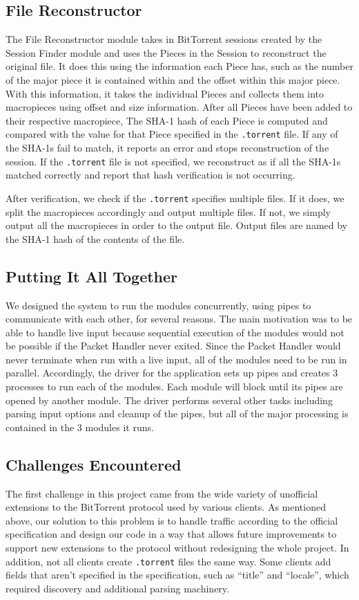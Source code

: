 \documentclass{acm_proc_article-sp}
\begin{document}
\subsection{File Reconstructor}
The File Reconstructor module takes in BitTorrent sessions created by the
Session Finder module and uses the Pieces in the Session to reconstruct the
original file. It does this using the information each Piece has, such as the
number of the major piece it is contained within and the offset within this
major piece. With this information, it takes the individual Pieces and
collects them into macropieces using offset and size information. After all
Pieces have been added to their respective macropiece, The SHA-1 hash of each
Piece is computed and compared with the value for that Piece specified in the
\texttt{.torrent} file. If any of the SHA-1s fail to match, it reports an error
and stops reconstruction of the session. If the \texttt{.torrent} file is not
specified, we reconstruct as if all the SHA-1s matched correctly and report
that hash verification is not occurring.

After verification, we check if the \texttt{.torrent} specifies multiple files.
If it does, we split the macropieces accordingly and output multiple files. If
not, we simply output all the macropieces in order to the output file. Output
files are named by the SHA-1 hash of the contents of the file.

\subsection{Putting It All Together}
We designed the system to run the modules concurrently, using pipes to
communicate with each other, for several reasons. The main motivation was to be
able to handle live input because sequential execution of the modules would not
be possible if the Packet Handler never exited. Since the Packet Handler would
never terminate when run with a live input, all of the modules need to be run in
parallel. Accordingly, the driver for the application sets up pipes and creates
3 processes to run each of the modules. Each module will block until its pipes
are opened by another module. The driver performs several other tasks including
parsing input options and cleanup of the pipes, but all of the major processing
is contained in the 3 modules it runs.

\subsection{Challenges Encountered}
The first challenge in this project came from the wide variety of unofficial
extensions to the BitTorrent protocol used by various clients. As mentioned
above, our solution to this problem is to handle traffic according to the
official specification and design our code in a way that allows future
improvements to support new extensions to the protocol without redesigning the
whole project.  In addition, not all clients create \texttt{.torrent} files the
same way.  Some clients add fields that aren't specified in the specification,
such as ``title'' and ``locale'', which required discovery and additional
parsing machinery.
\end{document}
